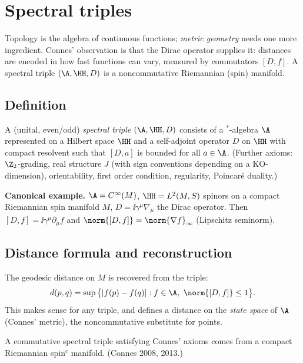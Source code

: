 \chapter{Spectral triples}\label{ch:spectral_triples}
\skippable

\begin{physmotiv}
Topology is the algebra of continuous functions; \emph{metric geometry} needs one more ingredient. Connes' observation is that the Dirac operator supplies it: distances are encoded in how fast functions can vary, measured by commutators $[D,f]$. A spectral triple $(\A,\HH,D)$ is a noncommutative Riemannian (spin) manifold.
\end{physmotiv}

\section{Definition}

\begin{definition}
A (unital, even/odd) \emph{spectral triple} $(\A,\HH,D)$ consists of a $^*$-algebra $\A$ represented on a Hilbert space $\HH$ and a self-adjoint operator $D$ on $\HH$ with compact resolvent such that $[D,a]$ is bounded for all $a\in\A$. (Further axioms: $\Z_2$-grading, real structure $J$ (with sign conventions depending on a KO-dimension), orientability, first order condition, regularity, Poincar\'e duality.)
\end{definition}

\textbf{Canonical example.} $\A=C^\infty(M)$, $\HH=L^2(M,S)$ spinors on a compact Riemannian spin manifold $M$, $D=\ii\gamma^\mu\nabla_\mu$ the Dirac operator. Then $[D,f]=\ii\gamma^\mu\partial_\mu f$ and $\norm{[D,f]}=\norm{\nabla f}_\infty$ (Lipschitz seminorm).

\section{Distance formula and reconstruction}

The geodesic distance on $M$ is recovered from the triple:
\begin{equation}
d(p,q)=\sup\big\{|f(p)-f(q)|:f\in\A,\ \norm{[D,f]}\le1\big\}.
\end{equation}
This makes sense for any triple, and defines a distance on the \emph{state space} of $\A$ (Connes' metric), the noncommutative substitute for points.

\begin{theorem}
A commutative spectral triple satisfying Connes' axioms comes from a compact Riemannian spin$^c$ manifold. (Connes 2008, 2013.)
\end{theorem}

